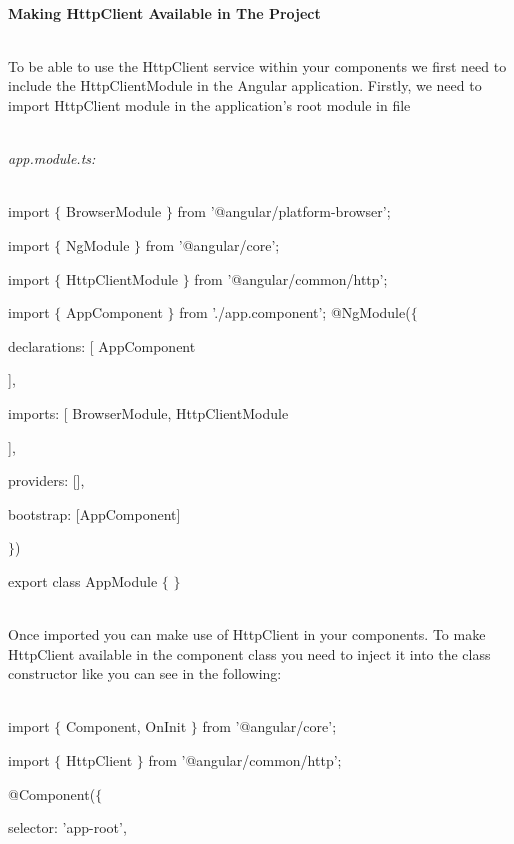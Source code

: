 \documentclass{article}
\begin{document}
\newpage
\noindent \\ \textbf{Making HttpClient Available in The Project}

\noindent 

\noindent \\ To be able to use the HttpClient service within your components we first need to include the HttpClientModule in the Angular application. Firstly, we need to import HttpClient module in the application's root module in file

\noindent 

\noindent \\ \textit{app.module.ts:}

\noindent 

\noindent \\ import $\mathrm{\{}$ BrowserModule $\mathrm{\}}$ from '@angular/platform-browser'; 

\noindent import $\mathrm{\{}$ NgModule $\mathrm{\}}$ from '@angular/core';

\noindent import $\mathrm{\{}$ HttpClientModule $\mathrm{\}}$ from '@angular/common/http'; 

\noindent import $\mathrm{\{}$ AppComponent $\mathrm{\}}$ from './app.component'; @NgModule($\mathrm{\{}$

\noindent declarations: [ AppComponent

\noindent ],

\noindent imports: [ BrowserModule, HttpClientModule

\noindent ],

\noindent providers: [],

\noindent bootstrap: [AppComponent]

\noindent $\mathrm{\}}$)

\noindent export class AppModule $\mathrm{\{}$ $\mathrm{\}}$

\noindent \\ Once imported you can make use of HttpClient in your components. To make HttpClient available in the component class you need to inject it into the class constructor like you can see in the following:

\noindent \\ import $\mathrm{\{}$ Component, OnInit $\mathrm{\}}$ from '@angular/core';

\noindent import $\mathrm{\{}$ HttpClient $\mathrm{\}}$ from '@angular/common/http';

\noindent @Component($\mathrm{\{}$

\noindent selector: 'app-root',
\end{document}
